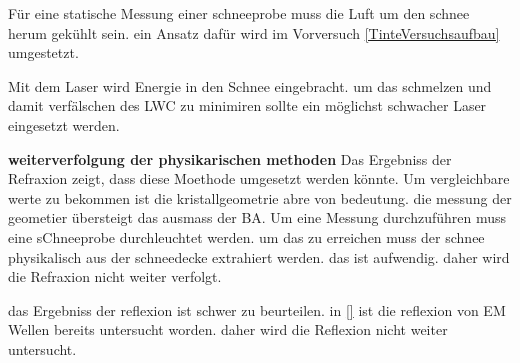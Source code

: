 Für eine statische Messung einer schneeprobe muss die Luft um den schnee herum gekühlt sein. ein Ansatz dafür wird im Vorversuch \ref{TinteVersuchsaufbau} umgestetzt.

Mit dem Laser wird Energie in den Schnee eingebracht. um das schmelzen und damit verfälschen des LWC zu minimiren sollte ein möglichst schwacher Laser eingesetzt werden.

\textbf{weiterverfolgung der physikarischen methoden}
Das Ergebniss der Refraxion zeigt, dass diese Moethode umgesetzt werden könnte. Um vergleichbare werte zu bekommen ist die kristallgeometrie abre von bedeutung. die messung der geometier übersteigt das ausmass der BA. Um eine Messung durchzuführen muss eine sChneeprobe durchleuchtet werden. um das zu erreichen muss der schnee physikalisch aus der schneedecke extrahiert werden. das ist aufwendig. daher wird die Refraxion nicht weiter verfolgt.

das Ergebniss der reflexion ist schwer zu beurteilen. in \ref{} ist die reflexion von EM Wellen bereits untersucht worden. daher wird die Reflexion nicht weiter untersucht.


